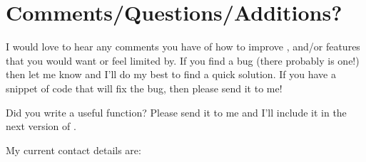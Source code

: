 \section{Comments/Questions/Additions?}
\label{sec:comments}

I would love to hear any comments you have of how
to improve \alis, and/or features that you would want
or feel limited by. If you find a bug (there probably is one!)
then let me know and I'll do my best to find a quick solution.
If you have a snippet of code that will fix the bug, then please
send it to me!

Did you write a useful function? Please send it to me and I'll
include it in the next version of \alis.

My current contact details are:

